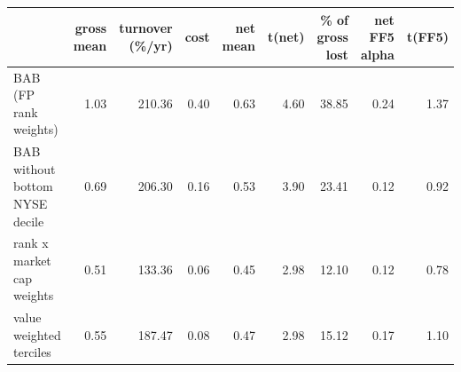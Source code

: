 \begin{tabular}{lrrrrrrrr}
\toprule
 & gross mean & turnover (\%/yr) & cost & net mean & t(net) & \% of gross lost & net FF5 alpha & t(FF5) \\
\midrule
BAB (FP rank weights) & 1.03 & 210.36 & 0.40 & 0.63 & 4.60 & 38.85 & 0.24 & 1.37 \\
BAB without bottom NYSE decile & 0.69 & 206.30 & 0.16 & 0.53 & 3.90 & 23.41 & 0.12 & 0.92 \\
rank x market cap weights & 0.51 & 133.36 & 0.06 & 0.45 & 2.98 & 12.10 & 0.12 & 0.78 \\
value weighted terciles & 0.55 & 187.47 & 0.08 & 0.47 & 2.98 & 15.12 & 0.17 & 1.10 \\
\bottomrule
\end{tabular}
